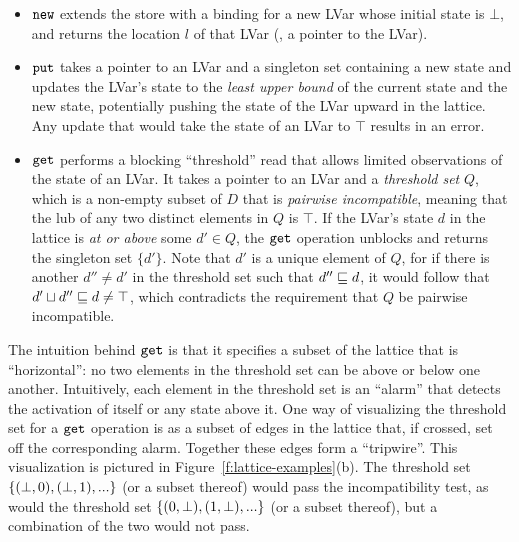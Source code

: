 \begin{itemize}
\item $\mbox{\texttt{new}}$ extends the store with a binding for a new LVar whose
  initial state is $\bot$, and returns the location $l$ of that LVar
  (\ie, a pointer to the LVar).
\item $\mbox{\texttt{put}}$ takes a pointer to an LVar and a singleton set containing
  a new state and updates the LVar's state to the {\em least upper bound} of the current state and the new state,
  potentially pushing the state of the LVar upward in the
  lattice.  Any update that would take the state of an LVar to $\top$
  results in an error.
\item $\mbox{\texttt{get}}$ performs a blocking ``threshold'' read that allows
  limited observations of the state of an LVar.  It takes a pointer to
  an LVar and a \emph{threshold set} $Q$, which is a non-empty subset
  of $D$ that is \emph{pairwise incompatible}, meaning that the lub of
  any two distinct elements in $Q$ is $\top$.  If the LVar's state $d$
  in the lattice is {\em at or above} some $d' \in Q$, the $\mbox{\texttt{get}}$
  operation unblocks and returns the singleton set $\lbrace d'
  \rbrace$.  Note that $d'$ is a unique element of $Q$, for if there
  is another $d'' \neq d'$ in the threshold set such that $d'' \sqsubseteq
  d$, it would follow that $d' \sqcup d'' \sqsubseteq d \neq \top$, which
  contradicts the requirement that $Q$ be pairwise incompatible.
\end{itemize}

\noindent The intuition behind $\mbox{\texttt{get}}$ is that
it specifies a subset of the lattice that is ``horizontal'': no two
elements in the threshold set can be above or below one another.  
Intuitively, each element in the threshold set is an
``alarm'' that detects the activation of itself or any state
above it.  One way of visualizing the threshold set for a $\mbox{\texttt{get}}$ operation
is as a subset of edges in the lattice that, if crossed, set off the
corresponding alarm.  Together these edges form a ``tripwire''.  This
visualization is pictured in Figure~\ref{f:lattice-examples}(b).  The
threshold set $\lbrace (\bot, 0), (\bot, 1), ... \rbrace$ (or a subset thereof)
would pass the incompatibility test, as would the threshold set
$\lbrace (0, \bot), (1, \bot), ... \rbrace$ (or a subset thereof), but a
combination of the two would not pass.


